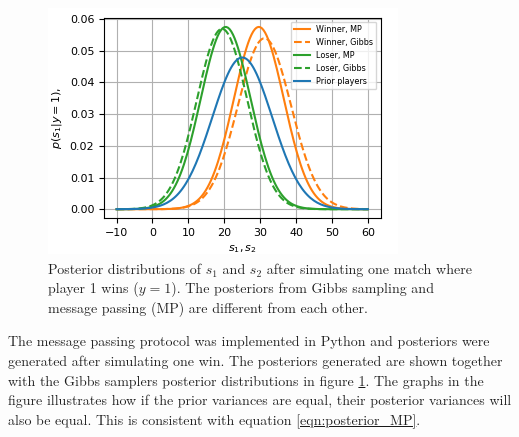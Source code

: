 \documentclass{article}
\begin{document}
		\begin{figure} %
			\centering
			\includegraphics[width=\linewidth]{q_8_1st}
			\caption{\footnotesize{Posterior distributions of $ s_1 $ and $ s_2 $ after simulating one match where player 1 wins ($ y=1 $). The posteriors from Gibbs sampling and message passing (MP) are different from each other.} }
			\label{fig:gibbs_mp_compare}
		\end{figure}
	The message passing protocol was implemented in Python and posteriors were generated after simulating one win.
	The posteriors generated are shown together with the Gibbs samplers posterior distributions in figure \ref{fig:gibbs_mp_compare}.
	The graphs in the figure illustrates how if the prior variances are equal, their posterior variances will also be equal. 
	This is consistent with equation \eqref{eqn:posterior_MP}.
	
\end{document}
